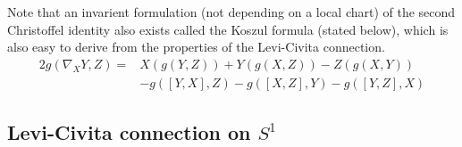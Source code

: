 \documentclass[a4paper]{article}
\theoremstyle{definition} \newtheorem*{definition}{Definition}
\theoremstyle{definition} \newtheorem*{definitions}{Definitions}
\theoremstyle{plain} \newtheorem{theorem}{Theorem}[section]
\theoremstyle{plain} \newtheorem{proposition}[theorem]{Proposition}
\theoremstyle{plain} \newtheorem{corollary}[theorem]{Corollary}
\theoremstyle{plain} \newtheorem{lemma}[theorem]{Lemma}
\theoremstyle{plain} \newtheorem{example}[theorem]{Example}
\begin{document}
Note that an invarient formulation (not depending on a local chart) of the second Christoffel identity also exists called the Koszul formula (stated below), which is also easy to derive from the properties of the Levi-Civita connection.
\begin{align*}
2g(\nabla_XY, Z) = & X(g(Y,Z))+Y(g(X,Z))-Z(g(X,Y)) \\
& -g([Y,X],Z)-g([X,Z],Y)-g([Y,Z],X)    
\end{align*}

\subsection{Levi-Civita connection on $S^1$}
\end{document}
